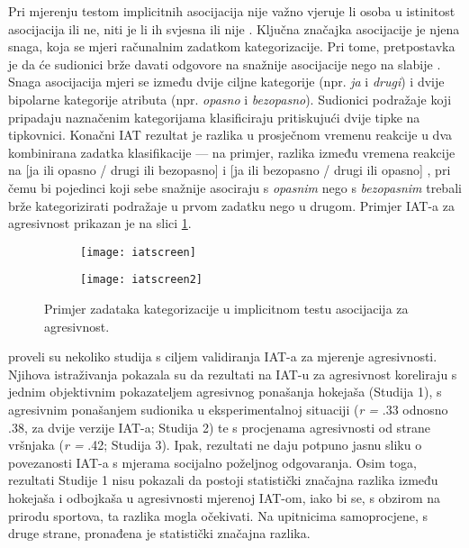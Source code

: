 \documentclass[a4paper, 12pt]{report}
\newcommand{\mti}[1]{\textit{#1}}
\begin{document}
Pri mjerenju testom implicitnih asocijacija nije važno vjeruje li osoba 
u istinitost asocijacija ili ne, niti je li ih  svjesna ili nije \citep{wileyhandzgal}.
Ključna značajka asocijacije je njena snaga, koja se mjeri
računalnim zadatkom kategorizacije. Pri tome, pretpostavka je da će sudionici
brže davati odgovore na snažnije asocijacije nego na slabije
\citep{wileyhandzgal, greenwald1995implicit}. Snaga asocijacija  mjeri se između
dvije ciljne kategorije (npr. \emph{ja} i \emph{drugi}) i dvije bipolarne
kategorije atributa (npr. \emph{opasno} i \emph{bezopasno}).
Sudionici podražaje koji pripadaju naznačenim kategorijama klasificiraju pritiskujući dvije
tipke na tipkovnici. Konačni IAT rezultat je razlika u prosječnom vremenu
reakcije u dva kombinirana zadatka klasifikacije --- na primjer, razlika između
vremena reakcije na
[ja ili opasno / drugi ili bezopasno] i [ja ili bezopasno / drugi ili opasno]
\citep{richetin2008automatic}, pri čemu bi pojedinci koji sebe snažnije asociraju s
\emph{opasnim} nego s \emph{bezopasnim} trebali brže kategorizirati podražaje u
prvom zadatku nego u drugom. Primjer IAT-a za agresivnost prikazan je na slici
\ref{iatapic}.

\begin{figure}
    \centering
    \hspace*{-0.7cm}\begin{subfigure}{0.45\linewidth}
        \centering
        \texttt{[image: iatscreen]}
        \caption{}
        \end{subfigure}
        \hspace*{2em}
    \begin{subfigure}{0.45\linewidth}
        \centering
        \texttt{[image: iatscreen2]}
        \caption{}
        \end{subfigure}
        \vspace*{-0.6cm}
        \caption{\label{iatapic} Primjer zadataka kategorizacije u implicitnom testu asocijacija za
    agresivnost.}
\end{figure}

\citet{banse2015predicting} proveli su nekoliko studija s ciljem validiranja
IAT-a za mjerenje agresivnosti.
Njihova  istraživanja pokazala su da rezultati na IAT-u za
agresivnost koreliraju s jednim objektivnim pokazateljem agresivnog ponašanja
hokejaša (Studija 1), s agresivnim ponašanjem sudionika u eksperimentalnoj situaciji (\mti{r =}
.33 odnosno .38, za dvije verzije IAT-a; Studija 2) te s procjenama
agresivnosti od strane vršnjaka (\mti{r =} .42; Studija 3).
Ipak, rezultati ne daju potpuno jasnu sliku o povezanosti IAT-a s mjerama
socijalno poželjnog odgovaranja. Osim toga, rezultati Studije 1 nisu pokazali da postoji
statistički značajna razlika između hokejaša i odbojkaša u agresivnosti mjerenoj
IAT-om, iako bi se, s obzirom na prirodu sportova, ta razlika mogla očekivati. 
Na upitnicima samoprocjene, s druge strane, pronađena je statistički značajna
razlika.
\end{document}

